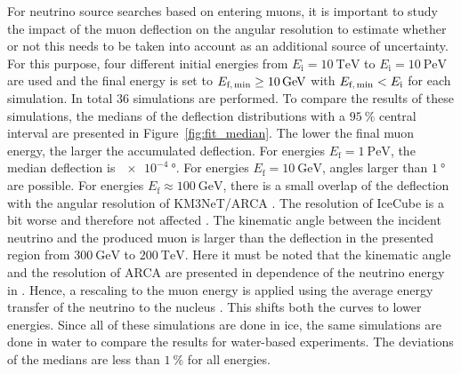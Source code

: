 \documentclass[pdflatex, sn-mathphys]{sn-jnl}%
\theoremstyle{thmstyleone}%
\theoremstyle{thmstyletwo}%
\theoremstyle{thmstylethree}%
\begin{document}
For neutrino source searches based on entering muons, it is important to study the impact of the muon 
deflection on the angular resolution to estimate whether or not this needs to be 
taken into account as an additional source of uncertainty.
For this purpose, four different initial energies 
from $E_{\text{i}} = \SI{10}{\tera\electronvolt}$ to 
$E_{\text{i}} = \SI{10}{\peta\electronvolt}$ are used and the final 
energy is set to $E_{\text{f,\,min}} \geq \SI{10}{\giga\electronvolt}$ with 
$E_{\text{f,\,min}} < E_{\text{i}}$ for each simulation. 
In total $\num{36}$ simulations are performed. 
To compare the results of these simulations, the medians of the deflection distributions 
with a $\SI{95}{\percent}$ central interval are presented in 
Figure~\ref{fig:fit_median}.
The lower the final muon energy, the larger the accumulated deflection. 
For energies $E_{\text{f}} = \SI{1}{\peta\electronvolt}$, the median deflection 
is $\SI{e-4}{\degree}$. For energies $E_{\text{f}} = \SI{10}{\giga\electronvolt}$, 
angles larger than $\SI{1}{\degree}$ are possible. For energies  
$E_{\text{f}} \approx \SI{100}{\giga\electronvolt}$, 
there is a small overlap of the deflection with the angular resolution of KM3NeT/ARCA 
\cite{KM3NeT_Resolution2016, KM3NeT_Resolution2021}. The resolution of IceCube is a bit worse and 
therefore not affected \cite{IceCube_Resolution2021}. 
The kinematic angle between the incident neutrino and the produced muon is 
larger than the deflection in the presented region from $\SI{300}{\giga\electronvolt}$
to $\SI{200}{\tera\electronvolt}$. Here it must be noted that the kinematic angle 
and the resolution of ARCA are presented in dependence of the neutrino energy 
in \cite{KM3NeT_Resolution2016, KM3NeT_Resolution2021}. Hence, a rescaling to the muon energy is applied using the average energy transfer of the neutrino to 
the nucleus \cite{GANDHI199681}. This shifts both the curves to lower energies. 
Since all of these simulations are done 
in ice, the same simulations are done in water to compare the results for 
water-based experiments. The deviations of the medians
are less than $\SI{1}{\percent}$ for all energies.
\end{document}
